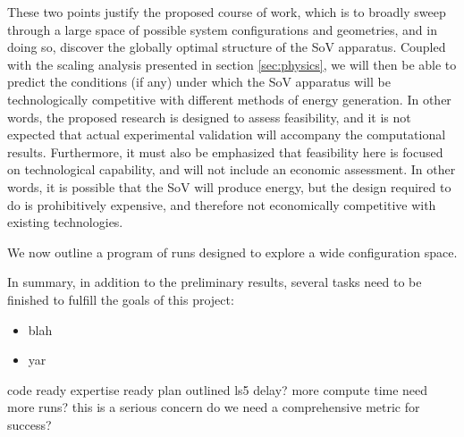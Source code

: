 These two points justify the proposed course of work, which is to
broadly sweep through a large space of possible system configurations
and geometries, and in doing so, discover the globally optimal structure
of the SoV apparatus. Coupled with the scaling analysis presented in
section \ref{sec:physics}, we will then be able to predict the
conditions (if any) under which the SoV apparatus will be
technologically competitive with different methods of energy
generation. In other words, the proposed research is designed to assess
feasibility, and it is not expected that actual experimental validation
will accompany the computational results. Furthermore, it must also be
emphasized that feasibility here is focused on technological capability,
and will not include an economic assessment. In other words, it is
possible that the SoV will produce energy, but the design required to do
is prohibitively expensive, and therefore not economically competitive
with existing technologies. 

%
%

%
%

%
%
We now outline a program of runs designed to explore a wide
configuration space. 

%
%




In summary, in addition to the preliminary results, several tasks need
to be finished to fulfill the goals of this project:

\begin{itemize}
\item blah
\item yar
\end{itemize}

%
%
code ready
expertise ready
plan outlined
ls5 delay?
more compute time
need more runs? this is a serious concern
do we need a comprehensive metric for success?